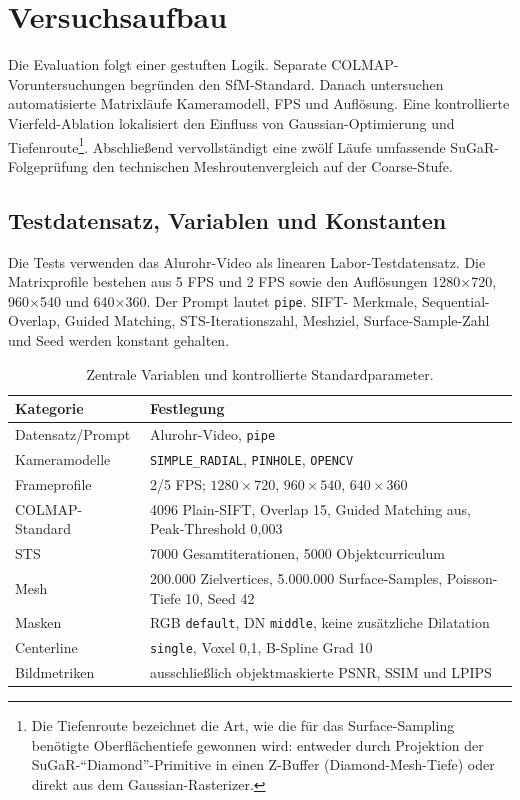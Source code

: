 \section{Versuchsaufbau}
\label{sec:versuchsaufbau}

Die Evaluation folgt einer gestuften Logik. Separate COLMAP-Voruntersuchungen
begründen den SfM-Standard. Danach untersuchen automatisierte Matrixläufe
Kameramodell, FPS und Auflösung. Eine kontrollierte Vierfeld-Ablation lokalisiert
den Einfluss von Gaussian-Optimierung und Tiefenroute\footnote{Die
Tiefenroute bezeichnet die Art, wie die für das Surface-Sampling benötigte
Oberflächentiefe gewonnen wird: entweder durch Projektion der
SuGaR-``Diamond''-Primitive in einen Z-Buffer (Diamond-Mesh-Tiefe) oder
direkt aus dem Gaussian-Rasterizer.}. Abschließend
vervollständigt eine zwölf Läufe umfassende SuGaR-Folgeprüfung den technischen
Meshroutenvergleich auf der Coarse-Stufe.

\subsection{Testdatensatz, Variablen und Konstanten}

Die Tests verwenden das Alurohr-Video als linearen Labor-Testdatensatz. Die
Matrixprofile bestehen aus 5 FPS und 2 FPS sowie den Auflösungen 1280$\times$720,
960$\times$540 und 640$\times$360. Der Prompt lautet \texttt{pipe}. SIFT-
Merkmale, Sequential-Overlap, Guided Matching, STS-Iterationszahl, Meshziel,
Surface-Sample-Zahl und Seed werden konstant gehalten.

\begin{table}[H]
\centering
\small
\begin{tabularx}{\textwidth}{p{3.5cm}X}
\toprule
Kategorie & Festlegung\\
\midrule
Datensatz/Prompt & Alurohr-Video, \texttt{pipe}\\
Kameramodelle & \texttt{SIMPLE\_RADIAL}, \texttt{PINHOLE}, \texttt{OPENCV}\\
Frameprofile & 2/5 FPS; $1280\times720$, $960\times540$, $640\times360$\\
COLMAP-Standard & 4096 Plain-SIFT, Overlap 15, Guided Matching aus,
Peak-Threshold 0,003\\
STS & 7000 Gesamtiterationen, 5000 Objektcurriculum\\
Mesh & 200.000 Zielvertices, 5.000.000 Surface-Samples, Poisson-Tiefe 10,
Seed 42\\
Masken & RGB \texttt{default}, DN \texttt{middle}, keine zusätzliche
Dilatation\\
Centerline & \texttt{single}, Voxel 0,1, B-Spline Grad 10\\
Bildmetriken & ausschließlich objektmaskierte PSNR, SSIM und LPIPS\\
\bottomrule
\end{tabularx}
\caption{Zentrale Variablen und kontrollierte Standardparameter.}
\label{tab:versuchsparameter}
\end{table}

